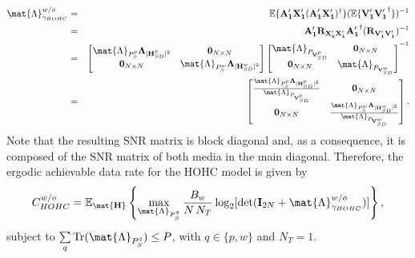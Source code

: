 \begin{eqnarray}
	\mat{\Lambda}_{\gamma_{HOHC}}^{w/o} & = & \mathbb{E}\{\mathbf{A'_1}\mathbf{X'_1}(\mathbf{A'_1}\mathbf{X'_1})^\dagger\}(\mathbb{E}\{\mathbf{V'_1}\mathbf{V'_1}^\dagger\})^{-1} \nonumber\\
	& = & \mathbf{A'_1} \mathbf{R}_{\mathbf{X'_1}\mathbf{X'_1}} \mathbf{A'_1}^\dagger (\mathbf{R}_{\mathbf{V'_1}\mathbf{V'_1}})^{-1} \nonumber\\
	& = & \begin{bmatrix} \mat{\Lambda}_{P_{S}^{p}} \mathbf{\Lambda}_{|\mathbf{H}_{SD}^p|^2} & \mathbf{0}_{N \times N} \\ \mathbf{0}_{N \times N} & \mat{\Lambda}_{P_{S}^{w}} \mathbf{\Lambda}_{|\mathbf{H}_{SD}^w|^2} \end{bmatrix}
	\begin{bmatrix} \mat{\Lambda}_{P_{\mathbf{V}_{SD}^p}} & \mathbf{0}_{N \times N} \\ \mathbf{0}_{N \times N} & \mat{\Lambda}_{P_{\mathbf{V}_{SD}^w}} \end{bmatrix}^{-1}  \nonumber\\
	& = & \begin{bmatrix} \frac{\mat{\Lambda}_{P_{S}^{p}} \mathbf{\Lambda}_{|\mathbf{H}_{SD}^p|^2}} {\mat{\Lambda}_{P_{\mathbf{V}_{SD}^p}}} & \mathbf{0}_{N \times N} \\ \mathbf{0}_{N \times N} & \frac{\mat{\Lambda}_{P_{S}^{w}} \mathbf{\Lambda}_{|\mathbf{H}_{SD}^w|^2}} {\mat{\Lambda}_{P_{\mathbf{V}_{SD}^w}}} \end{bmatrix}.
\end{eqnarray}
Note that the resulting \ac{SNR} matrix is block diagonal and, as a consequence, it is composed of the \ac{SNR} matrix of both media in the main diagonal. Therefore, the ergodic achievable data rate for the \ac{HOHC} model is given by
\begin{equation}
	C_{HOHC}^{w/o} = \mathbb{E}_{ \mat{\mathbf{H}}} \left\{\max_{\mat{\Lambda}_{P_{S}^{q}}} \dfrac{B_{w}}{N \, N_{T}} \log_{2} [\text{det}(\mathbf{I}_{2N}+ \mat{\Lambda}_{\gamma_{HOHC}}^{w/o} )]\right\},
\end{equation}
subject to $ \sum\limits_{q} \text{Tr}(\mat{\Lambda}_{P_{S}^{q}}) \leq P $, with $q \in \{p,w\}$ and $ N_{T} = 1 $.

